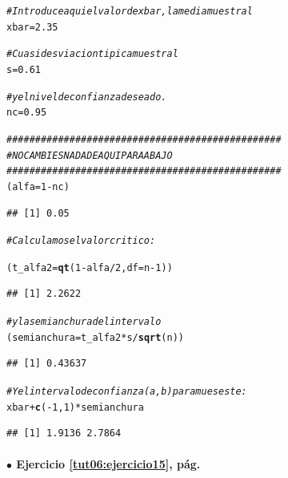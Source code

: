 \documentclass[10pt,a4paper]{article}\usepackage[]{graphicx}\usepackage[]{color}
\makeatletter
\newcommand{\hlnum}[1]{\textcolor[rgb]{0.686,0.059,0.569}{#1}}%
\newcommand{\hlcom}[1]{\textcolor[rgb]{0.678,0.584,0.686}{\textit{#1}}}%
\newcommand{\hlopt}[1]{\textcolor[rgb]{0,0,0}{#1}}%
\newcommand{\hlstd}[1]{\textcolor[rgb]{0.345,0.345,0.345}{#1}}%
\newcommand{\hlkwb}[1]{\textcolor[rgb]{0.69,0.353,0.396}{#1}}%
\newcommand{\hlkwc}[1]{\textcolor[rgb]{0.333,0.667,0.333}{#1}}%
\newcommand{\hlkwd}[1]{\textcolor[rgb]{0.737,0.353,0.396}{\textbf{#1}}}%
\newenvironment{kframe}{%
 \def\at@end@of@kframe{}%
 \ifinner\ifhmode%
  \def\at@end@of@kframe{\end{minipage}}%
  \begin{minipage}{\columnwidth}%
 \fi\fi%
 \def\FrameCommand##1{\hskip\@totalleftmargin \hskip-\fboxsep
 \colorbox{shadecolor}{##1}\hskip-\fboxsep
     \hskip-\linewidth \hskip-\@totalleftmargin \hskip\columnwidth}%
 \MakeFramed {\advance\hsize-\width
   \@totalleftmargin\z@ \linewidth\hsize
   \@setminipage}}%
 {\par\unskip\endMakeFramed%
 \at@end@of@kframe}
\newenvironment{knitrout}{}{} %
\makeatother
\begin{document}
\begin{enumerate}
\begin{knitrout}
\begin{kframe}
\begin{alltt}
\hlcom{# Introduce aqui el valor de xbar, la media muestral}
\hlstd{xbar} \hlkwb{=} \hlnum{2.35}

\hlcom{# Cuasidesviacion tipica muestral}
\hlstd{s} \hlkwb{=} \hlnum{0.61}

\hlcom{# y el nivel de confianza deseado.}
\hlstd{nc} \hlkwb{=} \hlnum{0.95}

\hlcom{################################################}
\hlcom{#NO CAMBIES NADA DE AQUI PARA ABAJO}
\hlcom{################################################}
\hlstd{(alfa} \hlkwb{=} \hlnum{1} \hlopt{-} \hlstd{nc )}
\end{alltt}
\begin{verbatim}
## [1] 0.05
\end{verbatim}
\begin{alltt}
\hlcom{# Calculamos el valor critico:}

\hlstd{(t_alfa2} \hlkwb{=} \hlkwd{qt}\hlstd{(} \hlnum{1} \hlopt{-} \hlstd{alfa} \hlopt{/} \hlnum{2} \hlstd{,} \hlkwc{df}\hlstd{=n}\hlopt{-}\hlnum{1} \hlstd{) )}
\end{alltt}
\begin{verbatim}
## [1] 2.2622
\end{verbatim}
\begin{alltt}
\hlcom{#y la semianchura del intervalo}
\hlstd{(semianchura}\hlkwb{=}\hlstd{t_alfa2} \hlopt{*} \hlstd{s} \hlopt{/} \hlkwd{sqrt}\hlstd{(n) )}
\end{alltt}
\begin{verbatim}
## [1] 0.43637
\end{verbatim}
\begin{alltt}
\hlcom{# Y el intervalo de confianza (a,b) para mu es este:}
\hlstd{xbar} \hlopt{+} \hlkwd{c}\hlstd{(}\hlopt{-}\hlnum{1}\hlstd{,} \hlnum{1}\hlstd{)} \hlopt{*} \hlstd{semianchura}
\end{alltt}
\begin{verbatim}
## [1] 1.9136 2.7864
\end{verbatim}
\end{kframe}
\end{knitrout}


\end{enumerate}

\paragraph{\bf $\bullet$ Ejercicio \ref{tut06:ejercicio15}, pág. \pageref{tut06:ejercicio15}}
\label{tut06:ejercicio15:sol}\quad\\
\end{document}
